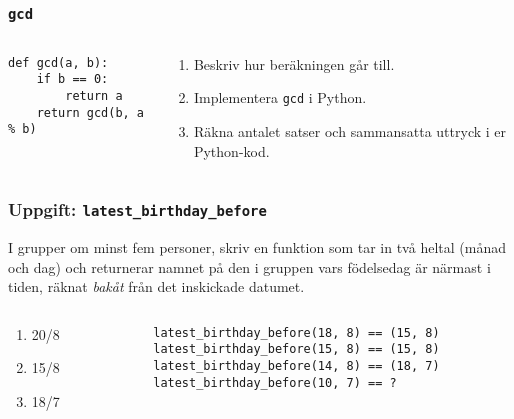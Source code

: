 \documentclass{beamer}
\begin{document}
  \begin{frame}[fragile]
    \frametitle{\texttt{gcd}}

    \begin{columns}
      \begin{column}{0.48\textwidth}
        \begin{verbatim}
def gcd(a, b):
    if b == 0:
        return a
    return gcd(b, a % b)
        \end{verbatim}
      \end{column}%
      \begin{column}{0.48\textwidth}
        \begin{enumerate}
          \item Beskriv hur beräkningen går till.
          \item Implementera \texttt{gcd} i Python.
          \item Räkna antalet satser och sammansatta uttryck i er Python-kod.
        \end{enumerate}
      \end{column}%
    \end{columns}
  \end{frame}

  \begin{frame}
    \frametitle{Uppgift: \texttt{latest\_birthday\_before}}

    I grupper om minst fem personer, skriv en funktion som tar in två heltal
    (månad och dag) och returnerar namnet på den i gruppen vars födelsedag är
    närmast i tiden, räknat \emph{bakåt} från det inskickade datumet.

    \pause

    \begin{columns}[T]
      \begin{column}{0.2\textwidth}
        \begin{enumerate}
          \item 20/8
          \item 15/8
          \item 18/7
        \end{enumerate}
      \end{column}%
      \begin{column}{0.78\textwidth}
        \texttt{latest\_birthday\_before(18, 8) == (15, 8)}\\
        \texttt{latest\_birthday\_before(15, 8) == (15, 8)}\\
        \texttt{latest\_birthday\_before(14, 8) == (18, 7)}\\
        \texttt{latest\_birthday\_before(10, 7) == ?}
      \end{column}%
    \end{columns}
  \end{frame}
\end{document}
